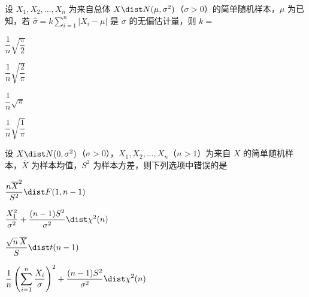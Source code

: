 \begin{question}[index=9]
设 $X_1,X_2,\ldots,X_n$ 为来自总体 $X\dist N(\mu,\sigma^2)$（$\sigma>0$）的简单随机样本，$\mu$ 为已知，若 $\displaystyle\widehat\sigma=k\sum_{i=1}^n|X_i-\mu|$ 是 $\sigma$ 的无偏估计量，则 $k=$
\begin{choices}[columns=2]
\item $\dfrac1n\sqrt{\dfrac\pi2}$
\item $\dfrac1n\sqrt{\dfrac2\pi}$
\item $\dfrac1n\sqrt\pi$
\item $\dfrac1n\sqrt{\dfrac1\pi}$
\end{choices}
\end{question}
\QuestionBreak

\begin{question}[index=10]
设 $X\dist N(0,\sigma^2)$（$\sigma>0$），$X_1,X_2,\ldots,X_n$（$n>1$）为来自 $X$ 的简单随机样本，$\overline X$ 为样本均值，$S^2$ 为样本方差，则下列选项中错误的是
\begin{choices}[columns=1]
\item $\dfrac{n\overline X^2}{S^2}\dist F(1,n-1)$
\item $\dfrac{X_1^2}{\sigma^2}+\dfrac{(n-1)S^2}{\sigma^2}\dist\chi^2(n)$
\item $\dfrac{\sqrt n\,\overline X}S\dist t(n-1)$
\item $\displaystyle\frac1n\left(\sum_{i=1}^n\frac{X_i}\sigma\right)^2+\frac{(n-1)S^2}{\sigma^2}\dist\chi^2(n)$
\end{choices}
\end{question}
